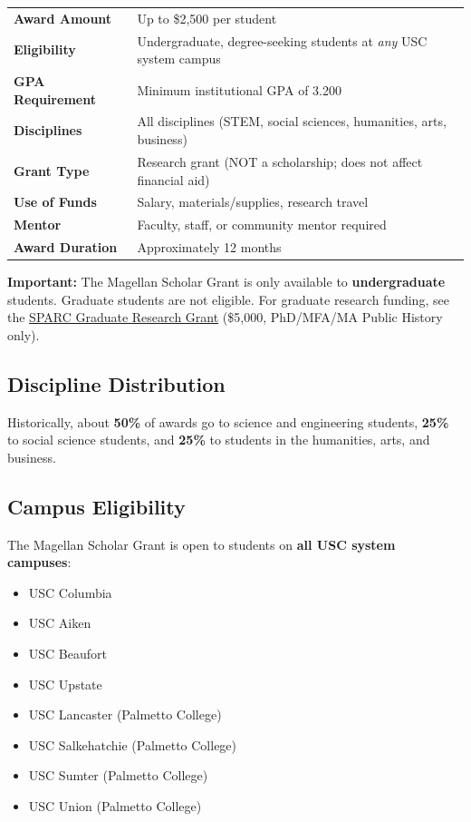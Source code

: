 \documentclass[11pt, letterpaper]{article}
\newcommand{\warnbox}[1]{%
\begin{tcolorbox}[colback=Black10, colframe=Rose]
\textbf{Important:} #1
\end{tcolorbox}
}
\begin{document}
\begin{tabularx}{\textwidth}{@{}>{\bfseries}l X@{}}
\toprule
Award Amount & Up to \$2,500 per student \\
Eligibility & Undergraduate, degree-seeking students at \emph{any} USC system campus \\
GPA Requirement & Minimum institutional GPA of 3.200 \\
Disciplines & All disciplines (STEM, social sciences, humanities, arts, business) \\
Grant Type & Research grant (NOT a scholarship; does not affect financial aid) \\
Use of Funds & Salary, materials/supplies, research travel \\
Mentor & Faculty, staff, or community mentor required \\
Award Duration & Approximately 12 months \\
\bottomrule
\end{tabularx}

\warnbox{The Magellan Scholar Grant is only available to \textbf{undergraduate} students. Graduate students are not eligible. For graduate research funding, see the \href{https://sc.edu/about/offices_and_divisions/research_and_grant_development/funding/internal_funding/sparc/}{SPARC Graduate Research Grant} (\$5,000, PhD/MFA/MA Public History only).}

\subsection{Discipline Distribution}

Historically, about \textbf{50\%} of awards go to science and engineering students, \textbf{25\%} to social science students, and \textbf{25\%} to students in the humanities, arts, and business.

\subsection{Campus Eligibility}

The Magellan Scholar Grant is open to students on \textbf{all USC system campuses}:

\begin{itemize}[nosep]
    \item USC Columbia
    \item USC Aiken
    \item USC Beaufort
    \item USC Upstate
    \item USC Lancaster (Palmetto College)
    \item USC Salkehatchie (Palmetto College)
    \item USC Sumter (Palmetto College)
    \item USC Union (Palmetto College)
\end{itemize}
\end{document}
